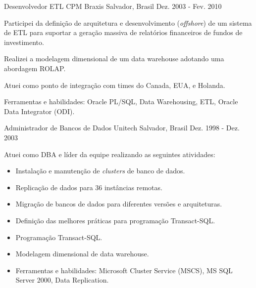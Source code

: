\begin{cventries}
\cventry
{Desenvolvedor ETL} %
{CPM Braxis} %
{Salvador, Brasil} %
{Dez. 2003 - Fev. 2010} %
{ %
\begin{cvitems}
\item{Participei da definição de arquitetura e desenvolvimento (\textit{offshore}) de um sistema de ETL para suportar a geração massiva de relatórios financeiros de fundos de investimento.} 
\item{Realizei a modelagem dimensional de um data warehouse adotando uma abordagem ROLAP.}
\item{Atuei como ponto de integração com times do Canada, EUA, e Holanda.}
\item{Ferramentas e habilidades: Oracle PL/SQL, Data Warehousing, ETL, Oracle Data Integrator (ODI).}
\end{cvitems}
}


\cventry
{Administrador de Bancos de Dados} %
{Unitech} %
{Salvador, Brasil} %
{Dez. 1998 - Dez. 2003} %
{ %
\begin{cvitems}
	\item{Atuei como DBA e líder da equipe realizando as seguintes atividades:}
	\begin{itemize}	
		\item{Instalação e manutenção de \textit{clusters} de banco de dados.}
		\item{Replicação de dados para 36 instâncias remotas.} 
		\item{Migração de bancos de dados para diferentes versões e arquiteturas.}
		\item{Definição das melhores práticas para programação Transact-SQL.}
		\item{Programação Transact-SQL.}
		\item{Modelagem dimensional de data warehouse.}
		\item{Ferramentas e habilidades: Microsoft Cluster Service (MSCS), MS SQL Server 2000, Data Replication.}
	\end{itemize}
\end{cvitems}
}


\end{cventries}